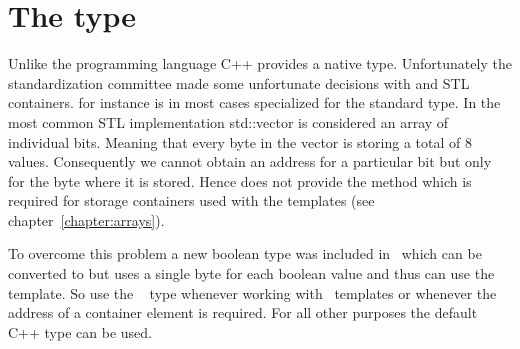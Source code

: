 \section{The  type}\label{section:using_bool}

Unlike the  programming language C++ provides a native  type. 
Unfortunately the  standardization committee made some unfortunate 
decisions with  and STL containers.  for instance is
in most cases specialized for the standard   type. 
In the most common STL implementation {\cpp std::vector} is considered an 
array of individual bits. Meaning that every byte in the vector is storing a
total of $8$  values. Consequently we cannot obtain an address 
for a particular bit but only for the byte where it is stored. 
Hence  does not provide the  method 
which is required for storage containers used with the  templates
(see chapter~\ref{chapter:arrays}). 

To overcome this problem a new boolean type was included in \libpnicore\ which 
can be converted to  but uses a single byte for each boolean value and
thus can use the  template. So use the \libpnicore\
 type whenever working with \libpnicore\ templates or whenever the
address of a container element is required. For all other purposes the default
C++ \cpp{bool} type can be used.
